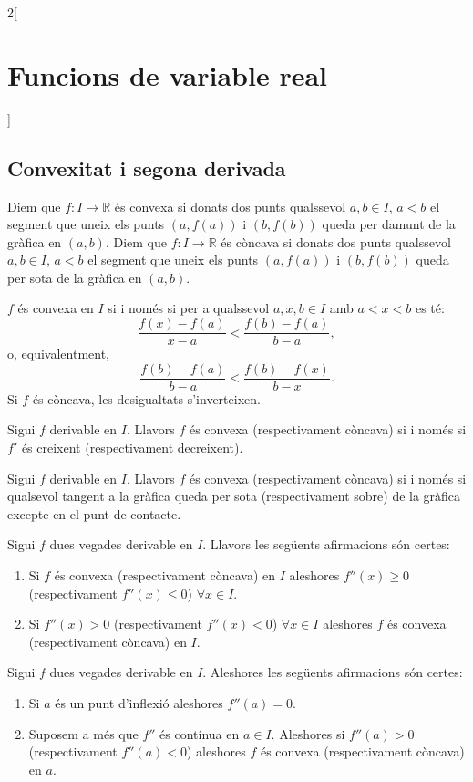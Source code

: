\documentclass[../../../main.tex]{subfiles}
\begin{document}
\begin{multicols}{2}[\section{Funcions de variable real}]
\subsection{Convexitat i segona derivada}
\begin{definition}
Diem que $f:I\rightarrow\mathbb{R}$ és convexa si donats dos punts qualssevol $a,b\in I$, $a<b$ el segment que uneix els punts $(a,f(a))$ i $(b,f(b))$ queda per damunt de la gràfica en $(a,b)$. Diem que $f:I\rightarrow\mathbb{R}$ és còncava si donats dos punts qualssevol $a,b\in I$, $a<b$ el segment que uneix els punts $(a,f(a))$ i $(b,f(b))$ queda per sota de la gràfica en $(a,b)$.
\end{definition}
\begin{lemma}
$f$ és convexa en $I$ si i només si per a qualssevol $a,x,b\in I$ amb $a<x<b$ es té: $$\frac{f(x)-f(a)}{x-a}<\frac{f(b)-f(a)}{b-a},$$ o, equivalentment, $$\frac{f(b)-f(a)}{b-a}<\frac{f(b)-f(x)}{b-x}.$$
Si $f$ és còncava, les desigualtats s'inverteixen.
\end{lemma}
\begin{theorem}
Sigui $f$ derivable en $I$. Llavors $f$ és convexa (respectivament còncava) si i només si $f'$ és creixent (respectivament decreixent).
\end{theorem}
\begin{theorem}
Sigui $f$ derivable en $I$. Llavors $f$ és convexa (respectivament còncava) si i només si qualsevol tangent a la gràfica queda per sota (respectivament sobre) de la gràfica excepte en el punt de contacte.
\end{theorem}
\begin{theorem}
Sigui $f$ dues vegades derivable en $I$. Llavors les següents afirmacions són certes:
\begin{enumerate}
    \item Si $f$ és convexa (respectivament còncava) en $I$ aleshores $f''(x)\geq 0$ (respectivament $f''(x)\leq 0$) $\forall x\in I$.
    \item Si $f''(x)>0$ (respectivament $f''(x)<0$) $\forall x\in I$ aleshores $f$ és convexa (respectivament còncava) en $I$.
\end{enumerate}
\begin{prop}
Sigui $f$ dues vegades derivable en $I$. Aleshores les següents afirmacions són certes:
\begin{enumerate}
    \item Si $a$ és un punt d'inflexió aleshores $f''(a)=0$.
    \item Suposem a més que $f''$ és contínua en $a\in I$. Aleshores si $f''(a)>0$ (respectivament $f''(a)<0$) aleshores $f$ és convexa (respectivament còncava) en $a$.
\end{enumerate}
\end{prop}
\end{theorem}

\end{multicols}
\end{document}
